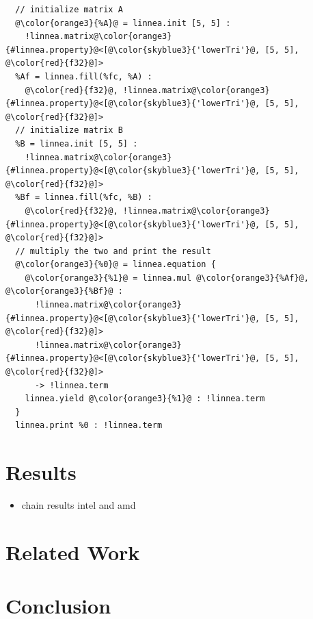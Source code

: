 \documentclass[conference]{IEEEtran}
\begin{document}
\begin{listing}[]
\begin{center}
\begin{minipage}[]{0.5\textwidth}
\begin{verbatim}
  // initialize matrix A
  @\color{orange3}{%A}@ = linnea.init [5, 5] : 
    !linnea.matrix@\color{orange3}{#linnea.property}@<[@\color{skyblue3}{'lowerTri'}@, [5, 5], @\color{red}{f32}@]>
  %Af = linnea.fill(%fc, %A) : 
    @\color{red}{f32}@, !linnea.matrix@\color{orange3}{#linnea.property}@<[@\color{skyblue3}{'lowerTri'}@, [5, 5], @\color{red}{f32}@]>
  // initialize matrix B
  %B = linnea.init [5, 5] : 
    !linnea.matrix@\color{orange3}{#linnea.property}@<[@\color{skyblue3}{'lowerTri'}@, [5, 5], @\color{red}{f32}@]>
  %Bf = linnea.fill(%fc, %B) : 
    @\color{red}{f32}@, !linnea.matrix@\color{orange3}{#linnea.property}@<[@\color{skyblue3}{'lowerTri'}@, [5, 5], @\color{red}{f32}@]>
  // multiply the two and print the result
  @\color{orange3}{%0}@ = linnea.equation {
    @\color{orange3}{%1}@ = linnea.mul @\color{orange3}{%Af}@, @\color{orange3}{%Bf}@ :
      !linnea.matrix@\color{orange3}{#linnea.property}@<[@\color{skyblue3}{'lowerTri'}@, [5, 5], @\color{red}{f32}@]>
      !linnea.matrix@\color{orange3}{#linnea.property}@<[@\color{skyblue3}{'lowerTri'}@, [5, 5], @\color{red}{f32}@]> 
      -> !linnea.term
    linnea.yield @\color{orange3}{%1}@ : !linnea.term
  }
  linnea.print %0 : !linnea.term
\end{verbatim}
\end{minipage}
  \caption{A Linnea IR representation for a multiplication between two lower triangular matrices.}
\label{lst:endtoend}
\end{center}
\end{listing}

\section{Results}
\begin{itemize}
  \item chain results intel and amd
\end{itemize}

\section{Related Work}

\section{Conclusion}
\end{document}
